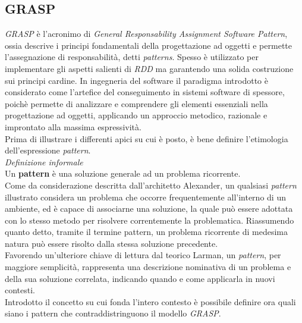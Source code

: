 \documentclass{article}
\begin{document}
\subsection*{GRASP}
\large
\textit{GRASP} è l'acronimo di \textit{General Responsability Assignment Software Pattern}, ossia descrive i principi fondamentali della progettazione ad oggetti e permette l'assegnazione di responsabilità, detti \textit{patterns}. Spesso è utilizzato per implementare gli aspetti salienti di \textit{RDD} ma garantendo una solida costruzione sui principi cardine. In ingegneria del software il paradigma introdotto è considerato come l'artefice del conseguimento in sistemi software di spessore, poichè permette di analizzare e comprendere gli elementi essenziali nella progettazione ad oggetti, applicando un approccio metodico, razionale e improntato alla massima espressività.\vspace*{14pt}\\
Prima di illustrare i differenti apici su cui è posto, è bene definire l'etimologia dell'espressione \textit{pattern}.\vspace*{14pt}\\
\textit{Definizione informale}\\
Un \textbf{pattern} è una soluzione generale ad un problema ricorrente.\vspace*{14pt}\\
Come da considerazione descritta dall'architetto Alexander, un qualsiasi \textit{pattern} illustrato considera un problema che occorre frequentemente all'interno di un ambiente, ed è capace di associarne una soluzione, la quale può essere adottata con lo stesso metodo per risolvere correntemente la problematica. Riassumendo quanto detto, tramite il termine pattern, un problema ricorrente di medesima natura può essere risolto dalla stessa soluzione precedente.\vspace*{14pt}\\
Favorendo un'ulteriore chiave di lettura dal teorico Larman, un \textit{pattern}, per maggiore semplicità, rappresenta una descrizione nominativa di un problema e della sua soluzione correlata, indicando quando e come applicarla in nuovi contesti.\vspace*{14pt}\\
Introdotto il concetto su cui fonda l'intero contesto è possibile definire ora quali siano i pattern che contraddistringuono il modello \textit{GRASP}.
\end{document}
